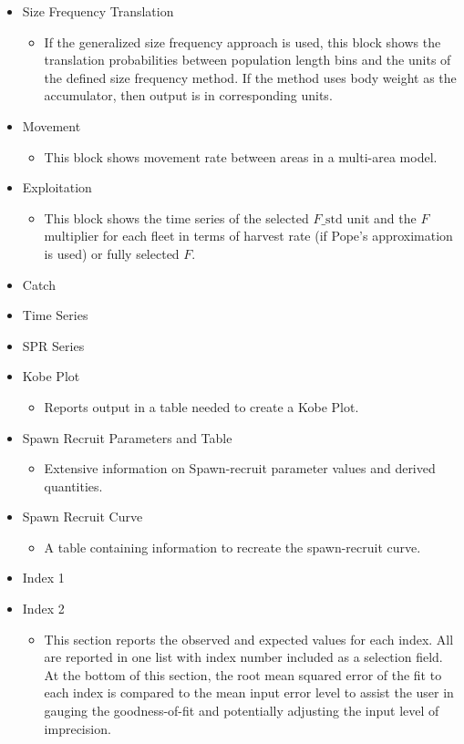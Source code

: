 \begin{itemize}
	\item Size Frequency Translation
	\begin{itemize}
		\item If the generalized size frequency approach is used, this block shows the translation probabilities between population length bins and the units of the defined size frequency method. If the method uses body weight as the accumulator, then output is in corresponding units.
	\end{itemize}
	\item Movement
	\begin{itemize}
		\item This block shows movement rate between areas in a multi-area model.
	\end{itemize}
	\item Exploitation
	\begin{itemize}
		\item This block shows the time series of the selected $F\text{\_std}$ unit and the $F$ multiplier for each fleet in terms of harvest rate (if Pope's approximation is used) or fully selected $F$.
	\end{itemize}
	\item Catch
	\item Time Series
	\item SPR Series
	\item Kobe Plot
	\begin{itemize}
	    \item Reports output in a table needed to create a Kobe Plot.
    \end{itemize}
	\item Spawn Recruit Parameters and Table
	\begin{itemize}
	    \item Extensive information on Spawn-recruit parameter values and derived quantities.
	\end{itemize}
	\item Spawn Recruit Curve
		\begin{itemize}
	    \item A table containing information to recreate the spawn-recruit curve. 
	\end{itemize}
	\item Index 1
	\item Index 2
	\begin{itemize}
		\item This section reports the observed and expected values for each index. All are reported in one list with index number included as a selection field. At the bottom of this section, the root mean squared error of the fit to each index is compared to the mean input error level to assist the user in gauging the goodness-of-fit and potentially adjusting the input level of imprecision.

\end{itemize}
\end{itemize}
